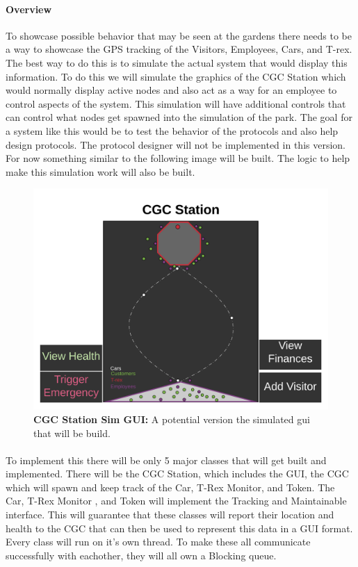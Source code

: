 \documentclass[12pt]{article}
\begin{document}
\paragraph{Overview} To showcase possible behavior that may be seen at the gardens there needs to be a way to showcase 
the GPS tracking of the Visitors, Employees, Cars, and T-rex. The best way to do this is to simulate the actual system 
that would display this information. To do this we will simulate the graphics of the CGC Station which would normally display active nodes
and also act as a way for an employee to control aspects of the system. This simulation will have additional controls that
can control what nodes get spawned into the simulation of the park. The goal for a system like this would be to test the behavior of the protocols 
and also help design protocols. The protocol designer will not be implemented in this version. For now something similar to the following image will be built.
The logic to help make this simulation work will also be built.

\begin{figure}[H]
    \centerline{\includegraphics[scale=.10]{CGCStationGUI.png}}
    \caption{\textbf{CGC Station Sim GUI: } A potential version the simulated gui that will be build.}
    \label{fig:CGCStationGUI}
\end{figure}

\paragraph{} To implement this there will be only 5 major classes that will get built and implemented. There 
will be the CGC Station, which includes the GUI, the CGC which will spawn and keep track of the Car, T-Rex Monitor, and Token.
The Car, T-Rex Monitor , and Token will implement the Tracking and Maintainable interface. This will guarantee that 
these classes will report their location and health to the CGC that can then be used to represent this data in a GUI format.
Every class will run on it's own thread. To make these all communicate successfully with eachother, they will all own a Blocking queue. 
\end{document}
